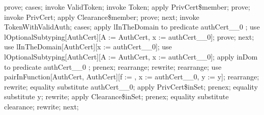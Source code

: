 \begin{zproof}
prove;
cases;
invoke ValidToken;
invoke Token;
apply PrivCert\$member;
prove;
invoke PrivCert;
apply Clearance\$member;
prove;
next;
invoke TokenWithValidAuth;
cases;
apply lInTheDomain to predicate authCert\_\_0 \in  \dom  \The;
use lOptionalSubtyping[AuthCert][A := AuthCert, x := authCert\_\_0];
prove;
next;
use lInTheDomain[AuthCert][x := authCert\_\_0];
use lOptionalSubtyping[AuthCert][A := AuthCert, x := authCert\_\_0];
apply inDom to predicate authCert\_\_0 \in  \dom  \The;
prenex;
rearrange;
rewrite;
rearrange;
use pairInFunction[\power AuthCert, AuthCert][f := \The[AuthCert], x := authCert\_\_0, y := y];
rearrange;
rewrite;
equality substitute \The authCert\_\_0;
apply PrivCert\$inSet;
prenex;
equality substitute y;
rewrite;
apply Clearance\$inSet;
prenex;
equality substitute clearance;
rewrite;
next;
\end{zproof}

